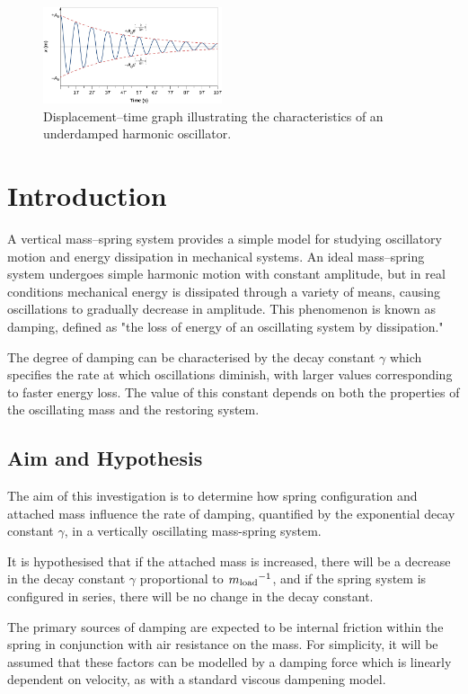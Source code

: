 \begin{figure}
    \centering
    \includegraphics[width=0.47\textwidth]{images/damped_shm.png}
    \caption{Displacement--time graph illustrating the characteristics of an underdamped harmonic oscillator.}
\end{figure}

\section{Introduction}

A vertical mass--spring system provides a simple model for studying oscillatory motion and energy dissipation in mechanical systems. An ideal mass--spring system undergoes simple harmonic motion with constant amplitude, but in real conditions mechanical energy is dissipated through a variety of means, causing oscillations to gradually decrease in amplitude. This phenomenon is known as damping, defined as "the loss of energy of an oscillating system by dissipation."

The degree of damping can be characterised by the decay constant $\gamma$ which specifies the rate at which oscillations diminish, with larger values corresponding to faster energy loss. The value of this constant depends on both the properties of the oscillating mass and the restoring system.

\subsection{Aim and Hypothesis}
The aim of this investigation is to determine how spring configuration and attached mass influence the rate of damping, quantified by the exponential decay constant $\gamma$, in a vertically oscillating mass-spring system.

It is hypothesised that if the attached mass is increased, there will be a decrease in the decay constant $\gamma$ proportional to $m{\textsubscript{load}}^{-1}$, and if the spring system is configured in series, there will be no change in the decay constant.

The primary sources of damping are expected to be internal friction within the spring in conjunction with air resistance on the mass. For simplicity, it will be assumed that these factors can be modelled by a damping force which is linearly dependent on velocity, as with a standard viscous dampening model.

